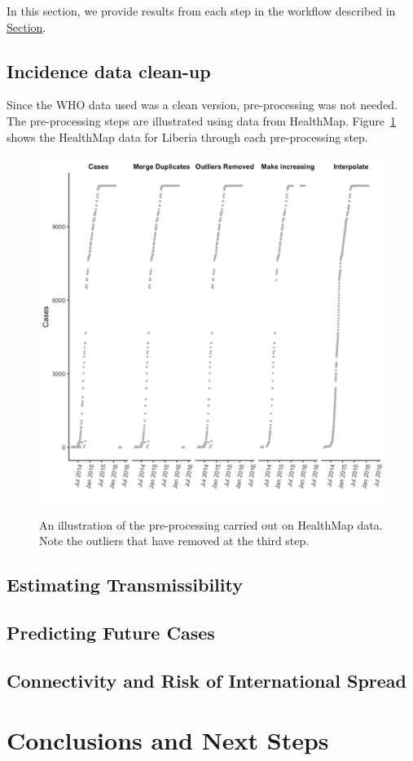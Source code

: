 \documentclass[11pt,]{article}
\begin{document}
In this section, we provide results from each step in the workflow
described in \protect\hyperlink{workflow}{Section}.

\subsection{Incidence data clean-up}\label{incidence-data-clean-up}

Since the WHO data used was a clean version, pre-processing was not
needed. The pre-processing steps are illustrated using data from
HealthMap. Figure~\ref{fig:lbr_cleanup} shows
the HealthMap data for Liberia through each pre-processing step.

\begin{figure}
  \includegraphics[]{"ms6-figures/liberia-preprocessing"}
  \label{fig:lbr_cleanup}
  \caption{An illustration of the pre-processing carried out on
    HealthMap data. Note the outliers that have removed at the third
    step.}
\end{figure}

\subsection{Estimating
Transmissibility}\label{estimating-transmissibility}

\subsection{Predicting Future Cases}\label{predicting-future-cases}

\subsection{Connectivity and Risk of International
Spread}\label{connectivity-and-risk-of-international-spread}

\section{Conclusions and Next Steps}\label{conclusions-and-next-steps}

\renewcommand\refname{References}

\end{document}
